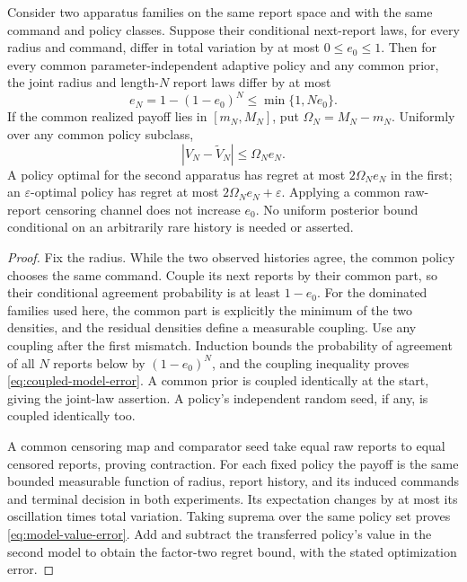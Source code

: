 \begin{theorem}\label{thm:model-stability}
Consider two apparatus families on the same report space and with the same
command and policy classes. Suppose their conditional next-report laws,
for every radius and command, differ in total variation by at most
$0\le e_0\le1$. Then for every common parameter-independent adaptive policy
and any common prior, the joint radius and length-$N$ report laws differ
by at most
\begin{equation}
 e_N=1-(1-e_0)^N\le\min\{1,Ne_0\}. \label{eq:coupled-model-error}
\end{equation}
If the common realized payoff lies in $[m_N,M_N]$, put
$\Omega_N=M_N-m_N$. Uniformly over any common policy subclass,
\begin{equation}
 |V_N-\widetilde V_N|\le\Omega_N e_N. \label{eq:model-value-error}
\end{equation}
A policy optimal for the second apparatus has regret at most
$2\Omega_N e_N$ in the first; an $\varepsilon$-optimal policy has regret
at most $2\Omega_N e_N+\varepsilon$. Applying a common raw-report censoring
channel does not increase $e_0$. No uniform posterior bound conditional
on an arbitrarily rare history is needed or asserted.
\end{theorem}
\begin{proof}
Fix the radius. While the two observed histories agree, the common policy
chooses the same command. Couple its next reports by their common part,
so their conditional agreement probability is at least $1-e_0$.
For the dominated families used here, the common part is explicitly the
minimum of the two densities, and the residual densities define a measurable
coupling. Use any coupling after the first mismatch. Induction bounds the
probability of agreement of all $N$ reports below by $(1-e_0)^N$, and the
coupling inequality proves \eqref{eq:coupled-model-error}. A common prior
is coupled identically at the start, giving the joint-law assertion.
A policy's independent random seed, if any, is coupled identically too.

A common censoring map and comparator seed take equal raw reports to equal
censored reports, proving contraction. For each fixed policy the payoff
is the same bounded measurable function of radius, report history, and
its induced commands and terminal decision in both experiments. Its
expectation changes by at most its oscillation times total variation.
Taking suprema over the same policy set proves \eqref{eq:model-value-error}.
Add and subtract the transferred policy's value in the second model to
obtain the factor-two regret bound, with the stated optimization error.
\end{proof}

